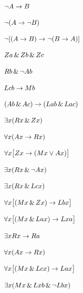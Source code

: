 \begin{earg}
\item %
$\neg A \rightarrow B$
\item %
$\neg(A \rightarrow \neg B)$
\item %
$\neg [(A\rightarrow B) \rightarrow \neg(B\rightarrow A)]$
\end{earg}



\begin{earg}
\item %
$Za \,\&\, Zb \,\&\, Zc$
\item %
$Rb \,\&\, \neg Ab$
\item %
$Lcb \rightarrow Mb$
\item %
$(Ab \,\&\, Ac)\rightarrow(Lab \,\&\, Lac)$
\item %
$\exists x(Rx \,\&\, Zx)$
\item %
$\forall x(Ax \rightarrow Rx)$
\item %
$\forall x\bigl[Zx \rightarrow (Mx \vee Ax)\bigr]$
\item %
$\exists x(Rx \,\&\, \neg Ax)$
\item %
$\exists x(Rx \,\&\, Lcx)$
\item %
$\forall x\bigl[(Mx \,\&\, Zx) \rightarrow Lbx\bigr]$
\item %
$\forall x\bigl[(Mx \,\&\, Lax) \rightarrow Lxa\bigr]$
\item %
$\exists x Rx \rightarrow Ra$
\item %
$\forall x(Ax \rightarrow Rx)$
\item %
$\forall x\bigl[(Mx \,\&\, Lcx) \rightarrow Lax\bigr]$
\item %
$\exists x(Mx \,\&\, Lxb \,\&\, \neg Lbx)$
\end{earg}


